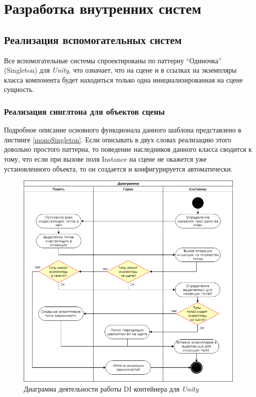 \chapter{Разработка внутренних систем}
\label{cha:ch_2}
\section{Реализация вспомогательных систем}
Все вспомогательные системы спроектированы по паттерну ``Одиночка'' (Singleton) для \textit{Unity}, что означает, что на сцене и в ссылках на экземпляры класса компонента будет находиться только одна инициализированная на сцене сущность.

\subsection{Реализация синглтона для объектов сцены}
Подробное описание основного функционала данного шаблона представлено в листинге \ref{monoSingleton}. Если описывать в двух словах реализацию этого довольно простого паттерна, то поведение наследников данного класса сводится к тому, что если при вызове поля Instance на сцене не окажется уже установленного объекта, то он создается и конфигурируется автоматически.

\begin{figure}[h]
	\centering
	\includegraphics[width=\linewidth]{containerDI.png}
	\caption{Диаграмма деятельности работы DI контейнера для \textit{Unity}}
	\label{injectionIllustration}
\end{figure}

